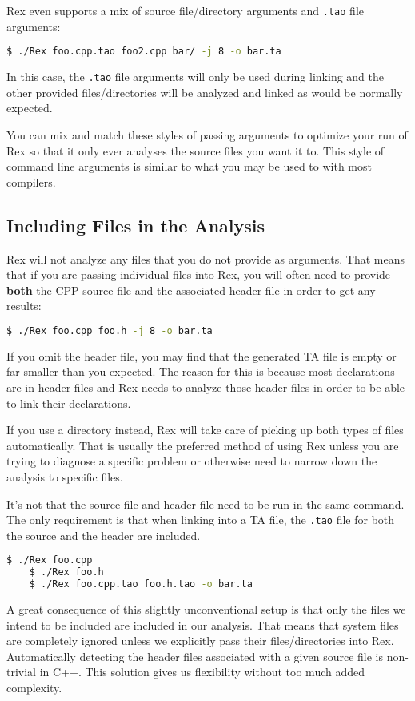 \noindent Rex even supports a mix of source file/directory arguments and
\texttt{.tao} file arguments:

\begin{lstlisting}[language=bash]
	$ ./Rex foo.cpp.tao foo2.cpp bar/ -j 8 -o bar.ta
\end{lstlisting}

\noindent In this case, the \texttt{.tao} file arguments will only be used
during linking and the other provided files/directories will be analyzed and
linked as would be normally expected.

You can mix and match these styles of passing arguments to optimize your run of
Rex so that it only ever analyses the source files you want it to. This style of
command line arguments is similar to what you may be used to with most
compilers.

\subsection{Including Files in the Analysis}

Rex will not analyze any files that you do not provide as arguments. That means
that if you are passing individual files into Rex, you will often need to
provide \textbf{both} the CPP source file and the associated header file in
order to get any results:

\begin{lstlisting}[language=bash]
	$ ./Rex foo.cpp foo.h -j 8 -o bar.ta
\end{lstlisting}

\noindent If you omit the header file, you may find that the generated TA file
is empty or far smaller than you expected. The reason for this is because most
declarations are in header files and Rex needs to analyze those header files in
order to be able to link their declarations.

If you use a directory instead, Rex will take care of picking up both types of
files automatically. That is usually the preferred method of using Rex unless
you are trying to diagnose a specific problem or otherwise need to narrow down
the analysis to specific files.

It's not that the source file and header file need to be run in the same
command. The only requirement is that when linking into a TA file, the
\texttt{.tao} file for both the source and the header are included.

\begin{lstlisting}[language=bash]
	$ ./Rex foo.cpp
	$ ./Rex foo.h
	$ ./Rex foo.cpp.tao foo.h.tao -o bar.ta
\end{lstlisting}

\noindent A great consequence of this slightly unconventional setup is that only
the files we intend to be included are included in our analysis. That means that
system files are completely ignored unless we explicitly pass their
files/directories into Rex.  Automatically detecting the header files associated
with a given source file is non-trivial in C++. This solution gives us
flexibility without too much added complexity.


